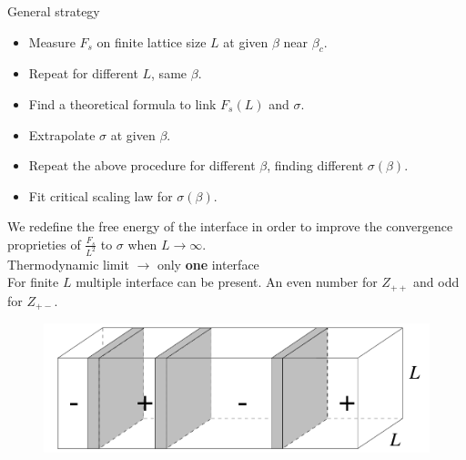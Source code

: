 \documentclass[12pt,handout]{beamer}
\begin{document}
\begin{frame}{General strategy}
\begin{center}
\begin{itemize}
\item Measure $F_s$ on finite lattice size $L$ at given $\beta$ near $\beta_c$.
\item Repeat for different $L$, same $\beta$.
\item Find a theoretical formula to link $F_s(L)$ and $\sigma$.
\item Extrapolate $\sigma$ at given $\beta$.
\item Repeat the above procedure for different $\beta$, finding different $\sigma \left(\beta \right)$.
\item Fit critical scaling law for $\sigma\left(\beta \right)$.
\end{itemize}
\end{center}
\end{frame}


\begin{frame}
\begin{center}
We redefine the free energy of the interface in order to improve the convergence proprieties of $\frac{F_s}{L^2}$ to $\sigma$ when $L \rightarrow \infty$.\\
\vspace{10pt}
Thermodynamic limit {\Large $\rightarrow$} only \textbf{one} interface\\
For finite $L$ multiple interface can be present. An even number for $Z_{++}$ and odd for $Z_{+-}$.\\

\begin{figure}[!htb]
\centering
\includegraphics[scale=0.3]{multiple.png}
\end{figure}

\end{center}
\end{frame}
\end{document}
